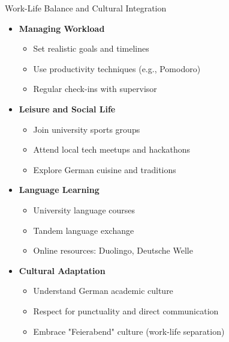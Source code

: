 \documentclass[aspectratio=169,10pt]{beamer}
\begin{document}
\begin{frame}{Work-Life Balance and Cultural Integration}
\begin{itemize}
    \item \textbf{Managing Workload}
    \begin{itemize}
        \item Set realistic goals and timelines
        \item Use productivity techniques (e.g., Pomodoro)
        \item Regular check-ins with supervisor
    \end{itemize}
    \item \textbf{Leisure and Social Life}
    \begin{itemize}
        \item Join university sports groups
        \item Attend local tech meetups and hackathons
        \item Explore German cuisine and traditions
    \end{itemize}
    \item \textbf{Language Learning}
    \begin{itemize}
        \item University language courses
        \item Tandem language exchange
        \item Online resources: Duolingo, Deutsche Welle
    \end{itemize}
    \item \textbf{Cultural Adaptation}
    \begin{itemize}
        \item Understand German academic culture
        \item Respect for punctuality and direct communication
        \item Embrace "Feierabend" culture (work-life separation)
    \end{itemize}
\end{itemize}
\end{frame}
\end{document}
